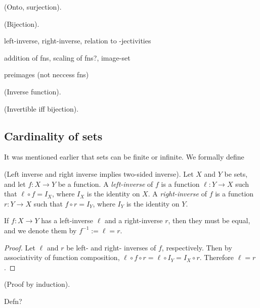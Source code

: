 \begin{defn}
    (Onto, surjection).
\end{defn}

\begin{defn}
    (Bijection).
\end{defn}

left-inverse, right-inverse, relation to -jectivities

addition of fns, scaling of fns?, image-set

preimages (not neccess fns)

\begin{defn}
\label{ch::logic_pf_fns::defn::inverse_fn}

    (Inverse function).
\end{defn}

\begin{theorem}
\label{ch::logic_pf_fns::thm::invertible_iff_bijection}
    (Invertible iff bijection).
\end{theorem}

\subsection*{Cardinality of sets}

It was mentioned earlier that sets can be finite or infinite. We formally define

\begin{theorem}
    (Left inverse and right inverse implies two-sided inverse). Let $X$ and $Y$ be sets, and let $f:X \rightarrow Y$ be a function. A \textit{left-inverse} of $f$ is a function $\ell:Y \rightarrow X$ such that $\ell \circ f = I_X$, where $I_X$ is the identity on $X$. A \textit{right-inverse} of $f$ is a function $r:Y \rightarrow X$ such that $f \circ r = I_Y$, where $I_Y$ is the identity on $Y$.
    
    If $f:X \rightarrow Y$ has a left-inverse $\ell$ and a right-inverse $r$, then they must be equal, and we denote them by $f^{-1} := \ell = r$.
\end{theorem}

\begin{proof}
    Let $\ell$ and $r$ be left- and right- inverses of $f$, respectively. Then by associativity of function composition, $\ell \circ f \circ r = \ell \circ I_Y = I_X \circ r$. Therefore $\ell = r$.
\end{proof}

\begin{defn}
    (Proof by induction).
    
    Defn?
\end{defn}
